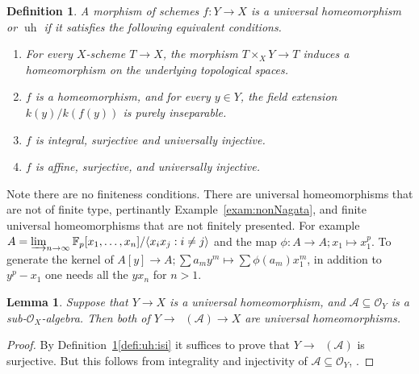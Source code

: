 \documentclass[10pt]{amsart}
\newtheorem{defi}[theo]{Definition}
\newtheorem{lemm}[theo]{Lemma}
\theoremstyle{definition}
\newcommand{\FF}{\mathbb{F}}
\newcommand{\OO}{\mathcal{O}}
\DeclareMathOperator{\uSpec}{\underline{Spec}}
\newcommand{\uh}{\operatorname{uh}}
\begin{document}
\begin{defi} \label{defi:uh}
A morphism of schemes $f: Y \to X$ is a \emph{universal homeomorphism} or $\uh$ if it satisfies the following equivalent conditions.
\begin{enumerate}
 \item For every $X$-scheme $T \to X$, the morphism $T \times_X Y \to T$ induces a homeomorphism on the underlying topological spaces.

 \item {\cite[Tag 01S4, Tag 01S3]{Stacks}} $f$ is a homeomorphism, and for every $y \in Y$, the field extension $k(y) / k(f(y))$ is purely inseparable.

 \item \label{defi:uh:isi} {\cite[Cor.18.12.11]{EGAIV4}}%
 $f$ is integral, %
surjective and universally injective.

 \item {\cite[Tag 01WM]{Stacks}} $f$ is affine, surjective, and universally injective.
\end{enumerate}
\end{defi}

Note there are no finiteness conditions. There are universal homeomorphisms that are not of finite type, pertinantly Example~\ref{exam:nonNagata}, and finite universal homeomorphisms that are not finitely presented. %
For example $A = \varinjlim_{n \to \infty} \FF_p[x_1, \dots, x_n] / \langle x_ix_j : i \neq j \rangle$ and the map $\phi: A {\to} A; x_1 {\mapsto} x_1^p$. To generate the kernel of $A[y] \to A; \sum a_m y^m \mapsto \sum \phi(a_m) x_1^m$, in addition to $y^p - x_1$ one needs all the $yx_n$ for $n > 1$.%

\begin{lemm} \label{lemm:subuh}
Suppose that $Y \to X$ is a universal homeomorphism, and $\mathcal{A} \subseteq \OO_Y$ is a sub-$\OO_X$-algebra. Then both of $Y \to \uSpec(\mathcal{A}) \to X$ are universal homeomorphisms. 
\end{lemm}

\begin{proof}
By Definition~\ref{defi:uh}\eqref{defi:uh:isi} it suffices to prove that $Y \to \uSpec(\mathcal{A})$ is surjective. But this follows from integrality and injectivity of $\mathcal{A} \subseteq \OO_Y$, \cite[{Tag 00GQ}]{Stacks}.
\end{proof}
\end{document}
